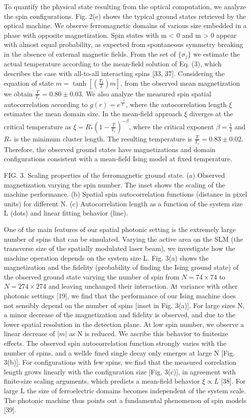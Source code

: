 To quantify the physical state resulting from the optical computation, we analyze the spin configurations. Fig. 2(e) shows the typical ground states retrieved by the optical machine. We observe ferromagnetic domains of various size embedded in a phase with opposite magnetization. Spin states with m < 0 and m > 0 appear with almost equal probability, as expected from spontaneous symmetry breaking in the absence of external magnetic fields. From the set of $\{\sigma_j\}$ we estimate the actual temperature according to the mean-field solution of Eq. (3), which describes the case with all-to-all interacting spins [33, 37]. Considering the equation of state $m = \tanh [(\frac{T_c}{T})m]$, from the observed mean magnetization we obtain $\frac{T}{T_c} = 0.80 \pm 0.03$. We also analyze the measured spin spatial autocorrelation according to $g(r) = e^{\frac{-r}{\xi}}$, where the autocorrelation length $\xi$ estimates the mean domain size. In the mean-field approach $\xi$ diverges at the critical temperature as $\xi = R_{*}(1 - \frac{T}{T_c})^{-\beta}$, where the critical exponent $\beta = \frac{1}{2}$ and $R_{*}$ is the minimum cluster length. The resulting temperature is $\frac{T}{T_c} = 0.83 \pm 0.02$. Therefore, the observed ground states have magnetizations and domain configurations consistent with a mean-field Ising model at fixed temperature.

FIG. 3. Scaling properties of the ferromagnetic ground state. (a) Observed magnetization varying the spin number. The inset shows the scaling of the machine performance. (b) Spatial spin autocorrelation functions (distance in pixel units) for different N. (c) Autocorrelation length as a function of the system size L (dots) and linear fitting behavior (line).

One of the main features of our spatial photonic setting is the extremely large number of spins that can be simulated. Varying the active area on the SLM (the transverse size of the spatially modulated laser beam), we investigate how the machine operation depends on the system size L. Fig. 3(a) shows the magnetization and the fidelity (probability of finding the Ising ground state) of the observed ground state varying the number of spin from $N = 74 \times 74$ to $N = 274 \times 274$ and leaving unchanged their interaction. At variance with other photonic settings [19], we find that the performance of our Ising machine does not sensibly depend on the number of spins [inset in Fig. 3(a)]. For large sizes N, a minor decrease of the magnetization and fidelity is observed, and due to the lower spatial resolution in the detection plane. At low spin number, we observe a linear decrease of $|m|$ as N is reduced. We ascribe this behavior to finitesize effects. The observed spin autocorrelation function strongly varies with the number of spins, and a wellde fined single decay only emerges at large N [Fig. 3(b)]. For configurations with few spins, we find that the measured correlation length grows linearly with the configuration size [Fig. 3(c)], in agreement with finite-size scaling arguments, which predicts a mean-field behavior $\xi \propto L $ [38]. For large L the size of ferroelectric domains becomes independent of the system scale. The photonic machine thus points out a fundamental phenomenon of spin models [39].

